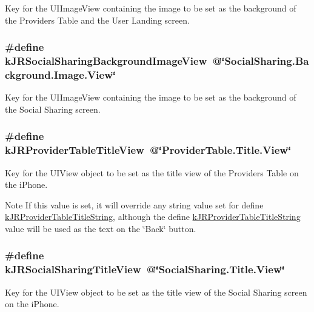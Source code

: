 \label{group__custom_interface_ga68a4950b1b3834ce60218856f596059f}
Key for the {\ttfamily UIImageView} containing the image to be set as the background of the Providers Table and the User Landing screen. \hypertarget{group__custom_interface_gafe08832d1e15427e1bc1c8c1e3a4c641}{
\subsubsection[{kJRSocialSharingBackgroundImageView}]{\setlength{\rightskip}{0pt plus 5cm}\#define kJRSocialSharingBackgroundImageView~@\char`\"{}SocialSharing.Background.Image.View\char`\"{}}}
\label{group__custom_interface_gafe08832d1e15427e1bc1c8c1e3a4c641}
Key for the {\ttfamily UIImageView} containing the image to be set as the background of the Social Sharing screen. \hypertarget{group__custom_interface_ga0bce97edf43c9cdf53cbcd1aa92c4798}{
\subsubsection[{kJRProviderTableTitleView}]{\setlength{\rightskip}{0pt plus 5cm}\#define kJRProviderTableTitleView~@\char`\"{}ProviderTable.Title.View\char`\"{}}}
\label{group__custom_interface_ga0bce97edf43c9cdf53cbcd1aa92c4798}
Key for the {\ttfamily UIView} object to be set as the title view of the Providers Table on the iPhone.

\begin{DoxyNote}{Note}
If this value is set, it will override any string value set for define \hyperlink{group__custom_interface_gaf728e45125be9ca6fa515a39a77e7ce7}{kJRProviderTableTitleString}, although the define \hyperlink{group__custom_interface_gaf728e45125be9ca6fa515a39a77e7ce7}{kJRProviderTableTitleString} value will be used as the text on the \char`\"{}Back\char`\"{} button. 
\end{DoxyNote}
\hypertarget{group__custom_interface_ga524965cf426f0eb9de4bcb804528c7f7}{
\subsubsection[{kJRSocialSharingTitleView}]{\setlength{\rightskip}{0pt plus 5cm}\#define kJRSocialSharingTitleView~@\char`\"{}SocialSharing.Title.View\char`\"{}}}
\label{group__custom_interface_ga524965cf426f0eb9de4bcb804528c7f7}
Key for the {\ttfamily UIView} object to be set as the title view of the Social Sharing screen on the iPhone.

